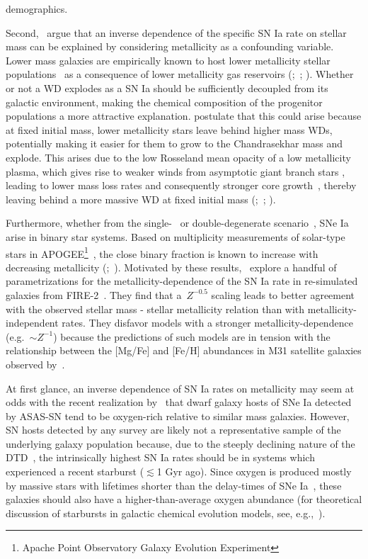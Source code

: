\documentclass[ms.tex]{subfiles}
\begin{document}
demographics.
\par
Second,~\citet{Kistler2013} argue that an inverse dependence of the
specific SN Ia rate on stellar mass can be explained by considering metallicity
as a confounding variable.
Lower mass galaxies are empirically known to host lower metallicity stellar
populations~\citep{Gallazzi2005, Kirby2013} as a consequence of lower
metallicity gas reservoirs (\citealp{Tremonti2004};~\citealp*{Zahid2011};
\citealp{Andrews2013, Zahid2014}).
Whether or not a WD explodes as a SN Ia should be sufficiently decoupled from
its galactic environment, making the chemical composition of the progenitor
populations a more attractive explanation.
\citet{Kistler2013} postulate that this could arise because at fixed initial
mass, lower metallicity stars leave behind higher mass WDs, potentially making
it easier for them to grow to the Chandrasekhar mass and explode.
This arises due to the low Rosseland mean opacity of a low metallicity plasma,
which gives rise to weaker winds from asymptotic giant branch stars
\citep{Willson2000, Marigo2007}, leading to lower mass loss rates and
consequently stronger core growth~\citep{Kalirai2014}, thereby leaving behind a
more massive WD at fixed initial mass (\citealp{Umeda1999};~\citealp*{Meng2008};
\citealp{Zhao2012}).
\par
Furthermore, whether from the single-~\citep[e.g.][]{Whelan1973} or
double-degenerate scenario~\citep[e.g.][]{Iben1984, Webbink1984}, SNe Ia arise
in binary star systems.
Based on multiplicity measurements of solar-type stars in APOGEE\footnote{
	Apache Point Observatory Galaxy Evolution Experiment
}~\citep{Majewski2017}, the close binary fraction is known to increase with
decreasing metallicity (\citealp{Badenes2018};~\citealp*{Moe2019}).
Motivated by these results,~\citet{Gandhi2022} explore a handful of
parametrizations for the metallicity-dependence of the SN Ia rate in
re-simulated galaxies from FIRE-2~\citep{Hopkins2018}.
They find that a~$Z^{-0.5}$ scaling leads to better agreement with the observed
stellar mass - stellar metallicity relation than with metallicity-independent
rates.
They disfavor models with a stronger metallicity-dependence (e.g.~$\sim Z^{-1}$)
because the predictions of such models are in tension with the relationship
between the [Mg/Fe] and [Fe/H] abundances in M31 satellite galaxies observed
by~\citet*{Vargas2014}.
\par
At first glance, an inverse dependence of SN Ia rates on metallicity may seem
at odds with the recent realization by~\citet{Holoien2022} that dwarf galaxy
hosts of SNe Ia detected by ASAS-SN tend to be oxygen-rich relative to similar
mass galaxies.
However, SN hosts detected by any survey are likely not a representative sample
of the underlying galaxy population because, due to the steeply declining
nature of the DTD~\citep[e.g.][]{Maoz2012a}, the intrinsically highest SN Ia
rates should be in systems which experienced a recent starburst ($\lesssim$1
Gyr ago).
Since oxygen is produced mostly by massive stars with lifetimes shorter than
the delay-times of SNe Ia~\citep*[e.g.][]{Hurley2000, Johnson2019}, these
galaxies should also have a higher-than-average oxygen abundance (for
theoretical discussion of starbursts in galactic chemical evolution models,
see, e.g.,~\citealt{Johnson2020}).
\end{document}
